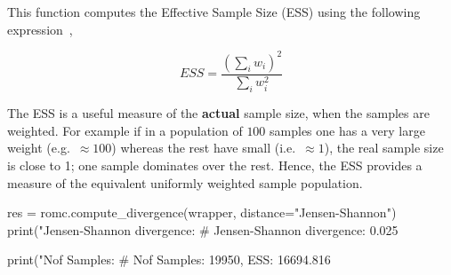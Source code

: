 \noindent
This function computes the Effective Sample Size (ESS) using the
following expression~\autocite{Sudman1967},

\begin{equation} \label{eq:ESS}
  ESS = \frac{(\sum_i w_i)^2}{\sum_i w_i^2}
\end{equation}

The ESS is a useful measure of the \textbf{actual} sample size, when
the samples are weighted. For example if in a population of $100$
samples one has a very large weight (e.g.\ $\approx 100$) whereas the
rest have small (i.e.\ $\approx 1$), the real sample size is close to
1; one sample dominates over the rest. Hence, the ESS provides a
measure of the equivalent uniformly weighted sample population.

\newpage


\begin{pythoncode}
res = romc.compute_divergence(wrapper, distance="Jensen-Shannon")                                 
print("Jensen-Shannon divergence: %
# Jensen-Shannon divergence: 0.025

print("Nof Samples: %
# Nof Samples: 19950, ESS: 16694.816
\end{pythoncode}
